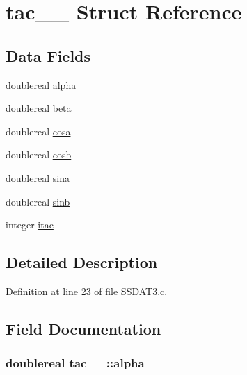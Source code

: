 \hypertarget{structtac__1__}{}\section{tac\+\_\+\_\+ Struct Reference}
\label{structtac__1__}
\subsection*{Data Fields}
\begin{DoxyCompactItemize}
\item 
doublereal \hyperlink{structtac__1___a628085754f815955e376017b8cc94307}{alpha}
\item 
doublereal \hyperlink{structtac__1___aaaab619f46670370c9fb7d5983929a27}{beta}
\item 
doublereal \hyperlink{structtac__1___a653f85db2c4bb50a53f554702b04b75d}{cosa}
\item 
doublereal \hyperlink{structtac__1___a408943828988ff737eb55941ebd501fc}{cosb}
\item 
doublereal \hyperlink{structtac__1___adc1fc802007127aaa0a665956cc8d696}{sina}
\item 
doublereal \hyperlink{structtac__1___a496bfd84cb97870d5d4512d4c7d836fd}{sinb}
\item 
integer \hyperlink{structtac__1___a9ff5dc2371992d00536ac9c6e6244a3b}{itac}
\end{DoxyCompactItemize}


\subsection{Detailed Description}


Definition at line 23 of file S\+S\+D\+A\+T3.\+c.



\subsection{Field Documentation}
\subsubsection[{\texorpdfstring{alpha}{alpha}}]{\setlength{\rightskip}{0pt plus 5cm}doublereal tac\+\_\+\_\+\+::alpha}\hypertarget{structtac__1___a628085754f815955e376017b8cc94307}{}\label{structtac__1___a628085754f815955e376017b8cc94307}


